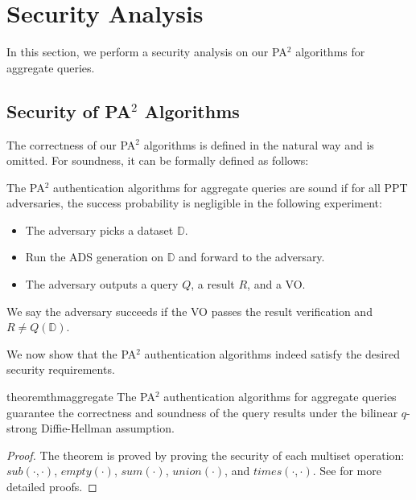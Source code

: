 \section{Security Analysis}\label{sec:aggregate-queries:security-analysis}

In this section, we perform a security analysis on our PA$^2$ algorithms for aggregate queries.

\subsection{Security of PA$^2$ Algorithms}

The correctness of our PA$^2$ algorithms is defined in the natural way and is omitted. For soundness, it can be formally defined as follows:

\begin{definition}[Soundness]\label{def:aggregate-queries:sound}
  The PA$^2$ authentication algorithms for aggregate queries are sound if for all PPT adversaries, the success probability is negligible in the following experiment:
  \begin{itemize}
    \item The adversary picks a dataset $\mathbb{D}$.
    \item Run the ADS generation on $\mathbb{D}$ and forward to the adversary.
    \item The adversary outputs a query $Q$, a result $R$, and a VO\@.
  \end{itemize}
  We say the adversary succeeds if the VO passes the result verification and $ R \neq Q(\mathbb{D})$.
\end{definition}

We now show that the PA$^2$ authentication algorithms indeed satisfy the desired security requirements.

\begin{restatable}{theorem}{thmaggregate}\label{thm:aggregate-queries:sec}
  The PA$^2$ authentication algorithms for aggregate queries guarantee the correctness and soundness of the query results under the bilinear $q$-strong Diffie-Hellman assumption.
\end{restatable}

\begin{proof}
  The theorem is proved by proving the security of each multiset operation: $sub(\cdot,\cdot)$, $empty(\cdot)$, $sum(\cdot)$, $union(\cdot)$, and $times(\cdot,\cdot)$. See  for more detailed proofs.
\end{proof}

